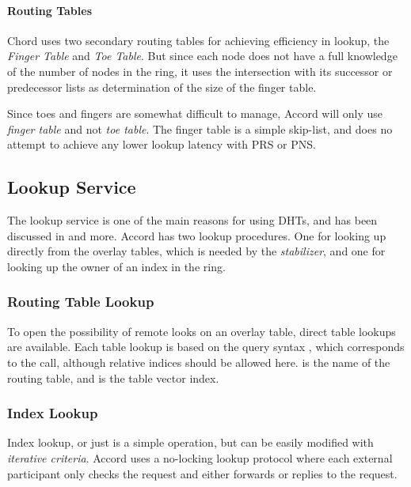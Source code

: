 \paragraph{Routing Tables}
\label{design:fingers}
Chord uses two secondary routing tables for achieving efficiency in lookup,
 the \emph{Finger Table} and \emph{Toe Table}. But since each node does not
 have a full knowledge of the number of nodes in the ring, it uses the
 intersection with its successor or predecessor lists as determination of
 the size of the finger table.

Since toes and fingers are somewhat difficult to manage, Accord will only use
 \emph{finger table} and not \emph{toe table}.
 The finger table is a simple skip-list, and does no attempt to
 achieve any lower lookup latency with PRS or PNS.


\subsection{Lookup Service}
\label{design:lookup}

The lookup service is one of the main reasons for using DHTs, and has been
 discussed in \cite{rhea-04-handling-churn,gupta-04-routing} and more.
 Accord has two lookup procedures. One for looking up directly
 from the overlay tables, which is needed by the \emph{stabilizer}, and one
 for looking up the owner of an index in the ring.

\subsubsection{Routing Table Lookup}
\label{design:table-lookup}

To open the possibility of remote looks on an overlay table, direct table lookups
 are available. Each table lookup is based on the query syntax ,
 which corresponds to the  call, although relative indices should
 be allowed here.  is the name of the routing table, and 
 is the table vector index.

\subsubsection{Index Lookup}
\label{design:index-lookup}

Index lookup, or just  is a simple operation,
 but can be easily modified with \emph{iterative criteria}.
 Accord uses a no-locking lookup protocol where each external participant
 only checks the request and either forwards or replies to the request.

